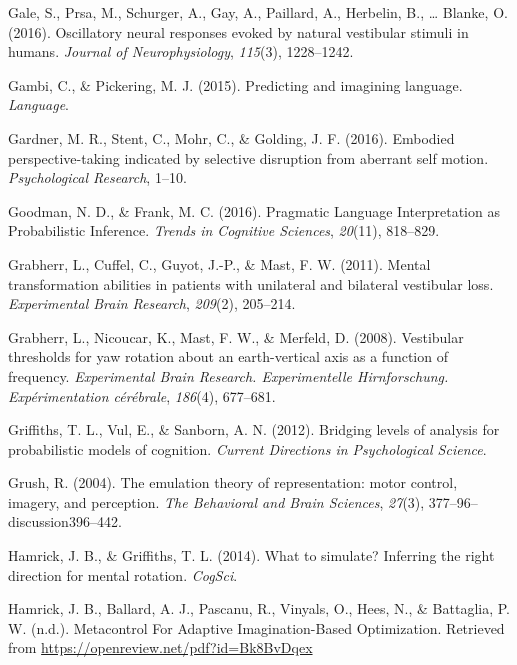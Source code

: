 \documentclass[english,floatsintext,man]{apa6}
\theoremstyle{definition}
\theoremstyle{definition}
\theoremstyle{remark}
\begin{document}
\hypertarget{ref-Gale:2016cx}{}
Gale, S., Prsa, M., Schurger, A., Gay, A., Paillard, A., Herbelin, B.,
\ldots{} Blanke, O. (2016). Oscillatory neural responses evoked by
natural vestibular stimuli in humans. \emph{Journal of Neurophysiology},
\emph{115}(3), 1228--1242.

\hypertarget{ref-Gambi:2015gv}{}
Gambi, C., \& Pickering, M. J. (2015). Predicting and imagining
language. \emph{Language}.

\hypertarget{ref-Gardner:2016kd}{}
Gardner, M. R., Stent, C., Mohr, C., \& Golding, J. F. (2016). Embodied
perspective-taking indicated by selective disruption from aberrant self
motion. \emph{Psychological Research}, 1--10.

\hypertarget{ref-Goodman:2016go}{}
Goodman, N. D., \& Frank, M. C. (2016). Pragmatic Language
Interpretation as Probabilistic Inference. \emph{Trends in Cognitive
Sciences}, \emph{20}(11), 818--829.

\hypertarget{ref-Grabherr:2011ej}{}
Grabherr, L., Cuffel, C., Guyot, J.-P., \& Mast, F. W. (2011). Mental
transformation abilities in patients with unilateral and bilateral
vestibular loss. \emph{Experimental Brain Research}, \emph{209}(2),
205--214.

\hypertarget{ref-Grabherr:2008kk}{}
Grabherr, L., Nicoucar, K., Mast, F. W., \& Merfeld, D. (2008).
Vestibular thresholds for yaw rotation about an earth-vertical axis as a
function of frequency. \emph{Experimental Brain Research. Experimentelle
Hirnforschung. Expérimentation cérébrale}, \emph{186}(4), 677--681.

\hypertarget{ref-Griffiths:2012ii}{}
Griffiths, T. L., Vul, E., \& Sanborn, A. N. (2012). Bridging levels of
analysis for probabilistic models of cognition. \emph{Current Directions
in Psychological Science}.

\hypertarget{ref-Grush:2004wx}{}
Grush, R. (2004). The emulation theory of representation: motor control,
imagery, and perception. \emph{The Behavioral and Brain Sciences},
\emph{27}(3), 377--96--discussion396--442.

\hypertarget{ref-Hamrick:2014wq}{}
Hamrick, J. B., \& Griffiths, T. L. (2014). What to simulate? Inferring
the right direction for mental rotation. \emph{CogSci}.

\hypertarget{ref-Hamrick:8oFH5gP_}{}
Hamrick, J. B., Ballard, A. J., Pascanu, R., Vinyals, O., Hees, N., \&
Battaglia, P. W. (n.d.). Metacontrol For Adaptive Imagination-Based
Optimization. Retrieved from
\url{https://openreview.net/pdf?id=Bk8BvDqex}
\end{document}
